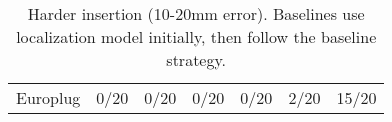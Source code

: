 \begin{table}[]
\begin{tabular}{l|r|r|r|r|r|r}
Europlug      & 0/20                         & 0/20                                                                        & 0/20                                                                        & 0/20                                                                        & 2/20                                                                         & 15/20                                                                
\end{tabular}
\caption{Harder insertion (10-20mm error). Baselines use localization model initially, then follow the baseline strategy. }
\label{table:hard}
\end{table}

\renewcommand{\arraystretch}{1.4}
\setlength{\arrayrulewidth}{0.1mm}
\setlength{\tabcolsep}{3pt}